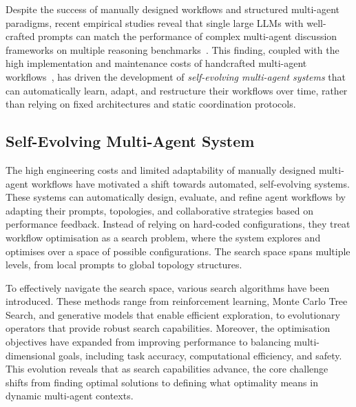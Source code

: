 \documentclass[]{selfevolagent}
\theoremstyle{plain}
\theoremstyle{definition}
\theoremstyle{remark}
\begin{document}
Despite the success of manually designed workflows and structured multi-agent paradigms, recent empirical studies reveal that single large LLMs with well-crafted prompts can match the performance of complex multi-agent discussion frameworks on multiple reasoning benchmarks~\citep{pan2025why}. This finding, coupled with the high implementation and maintenance costs of handcrafted multi-agent workflows~\citep{li2024autoflowautomatedworkflowgeneration,zhang2025aflow}, has driven the development of \textit{self-evolving multi-agent systems} that can automatically learn, adapt, and restructure their workflows over time, rather than relying on fixed architectures and static coordination protocols.

\subsection{Self-Evolving Multi-Agent System}
The high engineering costs and limited adaptability of manually designed multi-agent workflows have motivated a shift towards automated, self-evolving systems. These systems can automatically design, evaluate, and refine agent workflows by adapting their prompts, topologies, and collaborative strategies based on performance feedback. Instead of relying on hard-coded configurations, they treat workflow optimisation as a search problem, where the system explores and optimises over a space of possible configurations. The search space spans multiple levels, from local prompts to global topology structures. 

To effectively navigate the search space, various search algorithms have been introduced. 
These methods range from reinforcement learning, Monte Carlo Tree Search, and generative models that enable efficient exploration, to evolutionary operators that provide robust search capabilities.
Moreover, the optimisation objectives have expanded from improving performance to balancing multi-dimensional goals, including task accuracy, computational efficiency, and safety. This evolution reveals that as search capabilities advance, the core challenge shifts from finding optimal solutions to defining what optimality means in dynamic multi-agent contexts.
\end{document}
